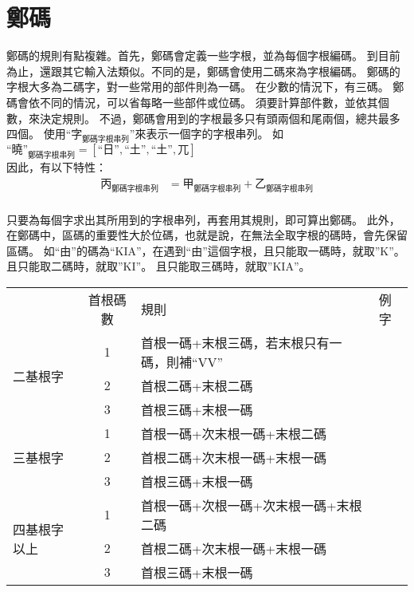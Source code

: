 \documentclass{article}
\begin{document}
\section{鄭碼}
鄭碼的規則有點複雜。首先，鄭碼會定義一些字根，並為每個字根編碼。
到目前為止，還跟其它輸入法類似。不同的是，鄭碼會使用二碼來為字根編碼。
鄭碼的字根大多為二碼字，對一些常用的部件則為一碼。
在少數的情況下，有三碼。
鄭碼會依不同的情況，可以省每略一些部件或位碼。
須要計算部件數，並依其個數，來決定規則。
不過，鄭碼會用到的字根最多只有頭兩個和尾兩個，總共最多四個。
使用``$\mbox{字}_{\mbox{鄭碼字根串列}}$''來表示一個字的字根串列。
如$\mbox{``曉''}_{\mbox{鄭碼字根串列}}=[\mbox{``日''}, \mbox{``土''}, \mbox{``土''}, \mbox{兀}]$\\

因此，有以下特性：
\begin{subequations}
  \begin{align}
  \mbox{丙}_{\mbox{鄭碼字根串列}} &= \mbox{甲}_{\mbox{鄭碼字根串列}} + \mbox{乙}_{\mbox{鄭碼字根串列}} \\
  \end{align}
\end{subequations}

只要為每個字求出其所用到的字根串列，再套用其規則，即可算出鄭碼。
此外，在鄭碼中，區碼的重要性大於位碼，也就是說，在無法全取字根的碼時，會先保留區碼。
如``由''的碼為``KIA''，在遇到``由''這個字根，且只能取一碼時，就取''K''。
且只能取二碼時，就取''KI''。
且只能取三碼時，就取''KIA''。

\begin{tabular}{lcll}
           & 首根碼數 & 規則 & 例字\\
  \multirow{3}{*}{二基根字} & 1 & 首根一碼+末根三碼，若末根只有一碼，則補``VV''\\
  & 2 & 首根二碼+末根二碼\\
  & 3 & 首根三碼+末根一碼\\
  \multirow{3}{*}{三基根字} & 1 & 首根一碼+次末根一碼+末根二碼\\
  & 2 & 首根二碼+次末根一碼+末根一碼\\
  & 3 & 首根三碼+末根一碼\\
  \multirow{4}{*}{四基根字以上} & 1 & 首根一碼+次根一碼+次末根一碼+末根二碼\\
  & 2 & 首根二碼+次末根一碼+末根一碼\\
  & 3 & 首根三碼+末根一碼\\
\end{tabular}
\end{document}
